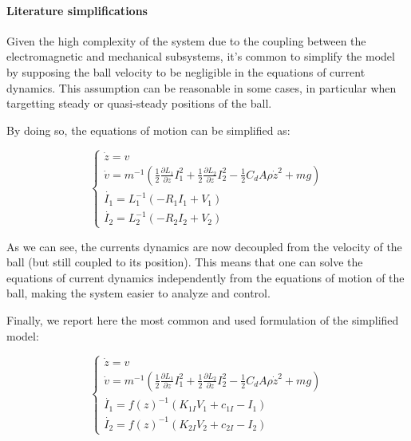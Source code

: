 \paragraph{Literature simplifications}

Given the high complexity of the system due to the coupling between the electromagnetic and mechanical subsystems, it's common to simplify the model by supposing the ball velocity to be negligible in the equations of current dynamics.
This assumption can be reasonable in some cases, in particular when targetting steady or quasi-steady positions of the ball.

By doing so, the equations of motion can be simplified as:

\begin{equation}
    \begin{cases}
        \dot{z} = v                                                                                                                                                                    \\
        \dot{v} = m^{-1} \left(\frac{1}{2} \frac{\partial L_1}{\partial z} I_1^2 + \frac{1}{2} \frac{\partial L_2}{\partial z} I_2^2 - \frac{1}{2} C_d A \rho \dot{z}^2 + m g  \right) \\
        \dot{I_1} = L_1^{-1} \left(- R_1 I_1 + V_1 \right)                                                                                                                             \\
        \dot{I_2} = L_2^{-1} \left(- R_2 I_2 + V_2 \right)
    \end{cases}
\end{equation}

As we can see, the currents dynamics are now decoupled from the velocity of the ball (but still coupled to its position).
This means that one can solve the equations of current dynamics independently from the equations of motion of the ball, making the system easier to analyze and control.

Finally, we report here the most common and used formulation of the simplified model:

\begin{equation}
    \begin{cases}
        \dot{z} = v                                                                                                                                                                    \\
        \dot{v} = m^{-1} \left(\frac{1}{2} \frac{\partial L_1}{\partial z} I_1^2 + \frac{1}{2} \frac{\partial L_2}{\partial z} I_2^2 - \frac{1}{2} C_d A \rho \dot{z}^2 + m g  \right) \\
        \dot{I_1} = f(z)^{-1} \left(K_{1I} V_1 + c_{1I} - I_1 \right)                                                                                                                  \\
        \dot{I_2} = f(z)^{-1} \left(K_{2I} V_2 + c_{2I} - I_2 \right)
    \end{cases}
    \label{eq:equations_of_motion_simplified}
\end{equation}

